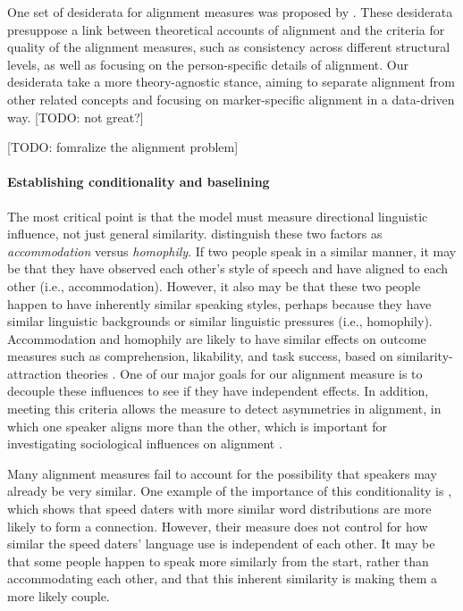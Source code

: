 \documentclass{acm_proc_article-sp}
\begin{document}
One set of desiderata for alignment measures was proposed by \cite{XuReitter2015}.  These desiderata presuppose a link between theoretical accounts of alignment and the criteria for quality of the alignment measures, such as consistency across different structural levels, as well as focusing on the person-specific details of alignment.  Our desiderata take a more theory-agnostic stance, aiming to separate alignment from other related concepts and focusing on marker-specific alignment in a data-driven way. [TODO: not great?]

[TODO: fomralize the alignment problem]

\paragraph{Establishing conditionality and baselining} The most critical point is that the model must measure directional linguistic influence, not just general similarity. \cite{DNMGamonDumais2011} distinguish these two factors as \textit{accommodation} versus \textit{homophily}.  If two people speak in a similar manner, it may be that they have observed each other's style of speech and have aligned to each other (i.e., accommodation). However, it also may be that these two people happen to have inherently similar speaking styles, perhaps because they have similar linguistic backgrounds or similar linguistic pressures (i.e., homophily). Accommodation and homophily are likely to have similar effects on outcome measures such as comprehension, likability, and task success, based on similarity-attraction theories \cite{Byrne1969,Triandis1960,GilesSmith1979}.  One of our major goals for our alignment measure is to decouple these influences to see if they have independent effects.  In addition, meeting this criteria allows the measure to detect asymmetries in alignment, in which one speaker aligns more than the other, which is important for investigating sociological influences on alignment \cite{DNMEtAl2012}.

Many alignment measures fail to account for the possibility that speakers may already be very similar.  One example of the importance of this conditionality is \cite{IrelandEtAl2011}, which shows that speed daters with more similar word distributions are more likely to form a connection. However, their measure does not control for how similar the speed daters' language use is independent of each other.  It may be that some people happen to speak more similarly from the start, rather than accommodating each other, and that this inherent similarity is making them a more likely couple.
\end{document}
